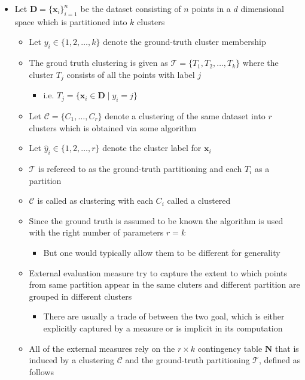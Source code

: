 \documentclass[11pt]{article}
\begin{document}
\begin{itemize}
\item Let \(\mathbf D= \{\pmb x_i \}^n_{i=1}\) be the dataset consisting of \(n\) points in a \(d\) dimensional space which is partitioned into \(k\) clusters
\begin{itemize}
\item Let \(y_i \in \{1,2,\dots,k\}\) denote the ground-truth cluster membership
\item The groud truth clustering is given as \(\mathcal T= \{T_1, T_2, \dots, T_k\}\) where the cluster \(T_j\) consists of all the points with label \(j\)
\begin{itemize}
\item i.e. \(T_j = \{\pmb x_i \in \mathbf D \mid y_i = j\}\)
\end{itemize}
\item Let \(\mathcal C = \{C_1, \dots, C_r\}\) denote a clustering of the same dataset into \(r\) clusters which is obtained via some algorithm
\item Let \(\hat y_i \in \{1,2,\dots,r\}\) denote the cluster label for \(\pmb x_i\)
\item \(\mathcal T\) is refereed to as the ground-truth partitioning and each \(T_i\) as a partition
\item \(\mathcal C\) is called as clustering with each \(C_i\) called a clustered
\item Since the ground truth is assumed to be known the algorithm is used with the right number of parameters \(r=k\)
\begin{itemize}
\item But one would typically allow them to be different for generality
\end{itemize}
\item External evaluation measure try to capture the extent to which points from same partition appear in the same cluters and different partition are grouped in different clusters
\begin{itemize}
\item There are usually a trade of between the two goal, which is either explicitly captured by a measure or is implicit in its computation
\end{itemize}
\item All of the external measures rely on the \(r \times k\) contingency table \(\mathbf N\) that is induced by a clustering \(\mathcal C\) and the ground-truth partitioning \(\mathcal T\), defined as follows
\end{itemize}
\end{itemize}
\end{document}
